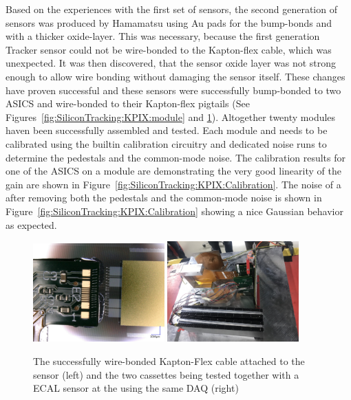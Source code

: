 Based on the experiences with the first set of sensors, the second generation of sensors was produced by Hamamatsu 
using Au pads for the \KPIX bump-bonds and with a thicker oxide-layer. This was necessary, because the first generation Tracker sensor could not be 
wire-bonded to the Kapton-flex cable, which was unexpected. It was then discovered, that the sensor oxide layer was not strong enough 
to allow wire bonding without damaging the sensor itself.
These changes have proven successful and these sensors were successfully bump-bonded to two \KPIX ASICS and wire-bonded to their Kapton-flex pigtails 
(See Figures~\ref{fig:SiliconTracking:KPIX:module} and \ref{fig:SiliconTracking:KPIX:Assembly}). Altogether twenty modules haven been successfully assembled and tested. 
Each module and \KPIX needs to be calibrated using the builtin calibration circuitry and dedicated noise runs to determine the pedestals and the 
common-mode noise.  The calibration results for one of the \KPIX ASICS on a module are demonstrating the very good  linearity of the 
\KPIX gain are shown in  Figure~\ref{fig:SiliconTracking:KPIX:Calibration}. The noise of a \KPIX after removing both the pedestals and the common-mode noise 
is shown in Figure~\ref{fig:SiliconTracking:KPIX:Calibration} showing a nice Gaussian behavior as expected.
\begin{figure}[htbp]
\includegraphics[width=0.45\textwidth]{Tracker/KPIX/KPIX_wirebonding.jpg}
\includegraphics[width=0.45\textwidth]{Tracker/KPIX/TB201902_tracker_Ecal_2.jpg}
\caption{The successfully wire-bonded Kapton-Flex cable attached to the sensor (left) and the two \LYCORIS cassettes being tested together with a \SID ECAL sensor at the \DIITBF using the same DAQ (right)}
\label{fig:SiliconTracking:KPIX:Assembly}
\end{figure}

